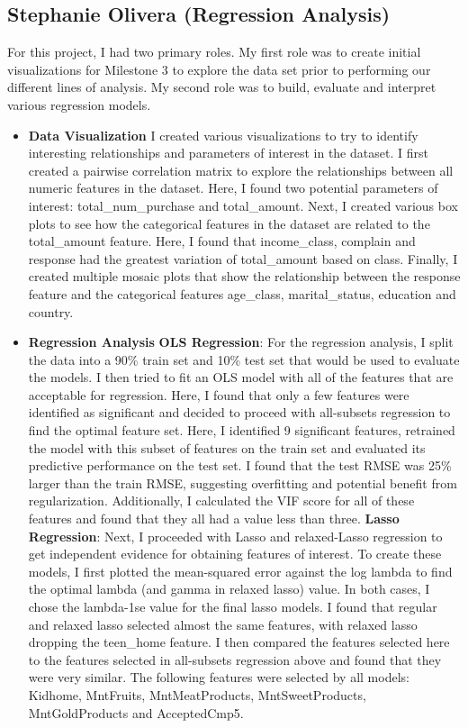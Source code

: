\documentclass[11pt]{article} %
\begin{document}
\subsection{Stephanie Olivera (Regression Analysis)}
For this project, I had two primary roles. My first role was to create initial visualizations for Milestone 3 to explore the data set prior to performing our different lines of analysis. My second role was to build, evaluate and interpret various regression models.
\begin{itemize}
\item \textbf{Data Visualization}
\newline
I created various visualizations to try to identify interesting relationships and parameters of interest in the dataset. I first created a pairwise correlation matrix to explore the relationships between all numeric features in the dataset. Here, I found two potential parameters of interest: total\_num\_purchase and total\_amount. Next, I created various box plots to see how the categorical features in the dataset are related to the total\_amount feature. Here, I found that income\_class, complain and response had the greatest variation of total\_amount based on class. Finally, I created multiple mosaic plots that show the relationship between the response feature and the categorical features age\_class, marital\_status, education and country. 
\item \textbf{Regression Analysis}
\newline
\textbf{OLS Regression}: For the regression analysis, I split the data into a 90\% train set and 10\% test set that would be used to evaluate the models. I then tried to fit an OLS model with all of the features that are acceptable for regression. Here, I found that only a few features were identified as significant and decided to proceed with all-subsets regression to find the optimal feature set. Here, I identified 9 significant features, retrained the model with this subset of features on the train set and evaluated its predictive performance on the test set. I found that the test RMSE was 25\% larger than the train RMSE, suggesting overfitting and potential benefit from regularization. Additionally, I calculated the VIF score for all of these features and found that they all had a value less than three. 
\newline
\textbf{Lasso Regression}: Next, I proceeded with Lasso and relaxed-Lasso regression to get independent evidence for obtaining features of interest. To create these models, I first plotted the mean-squared error against the log lambda to find the optimal lambda (and gamma in relaxed lasso) value. In both cases, I chose the lambda-1se value for the final lasso models. I found that regular and relaxed lasso selected almost the same features, with relaxed lasso dropping the teen\_home feature. I then compared the features selected here to the features selected in all-subsets regression above and found that they were very similar. The following features were selected by all models: Kidhome, MntFruits, MntMeatProducts, MntSweetProducts, MntGoldProducts and AcceptedCmp5. 

\end{itemize}
\end{document}
